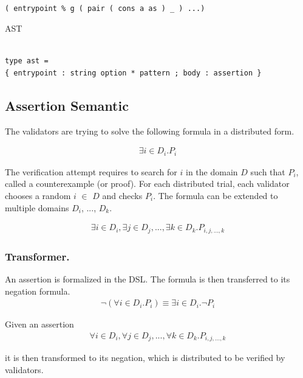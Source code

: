 \documentclass[runningheads]{llncs}
\begin{document}
\begin{lstlisting}[numbers=none]

( entrypoint % g ( pair ( cons a as ) _ ) ...)
\end{lstlisting}

AST

\begin{lstlisting}[numbers=none]

type ast =
{ entrypoint : string option * pattern ; body : assertion }

\end{lstlisting}

\subsection{Assertion Semantic}
The validators are trying to solve the following formula in a distributed form.

\begin{gather}
  \label{eq:2}
  \exists i \in D_{i}. P_{i}
\end{gather}

\noindent The verification attempt requires to search for $i$ in the domain $D$ such that $P_{i}$, called a counterexample (or proof). For each distributed trial, each validator chooses a random $i$ $\in$ $D$ and checks $P_{i}$. The formula can be extended to multiple domains $D_{i}$, ..., $D_{k}$.

\begin{gather}
  \label{eq:2}
\exists i \in D_{i}, \exists j \in D_{j}, ..., \exists k \in D_{k}. P_{i, j, ...,k}
\end{gather}

\subsubsection{Transformer. }
An assertion is formalized in the DSL. The formula is then transferred to its negation formula. 
\begin{gather}
  \label{eq:2}
\neg (\forall i \in D_{i}. P_{i}) \equiv \exists i \in D_{i}. \neg P_{i}
\end{gather}

\noindent Given an assertion
\begin{gather}
  \label{eq:2}
\forall i \in D_{i},  \forall j \in D_{j},  ..., \forall k \in D_{k}. P_{i, j, ...,k}
\end{gather}

\noindent it is then transformed to its negation, which is distributed to be verified by validators.
\end{document}
